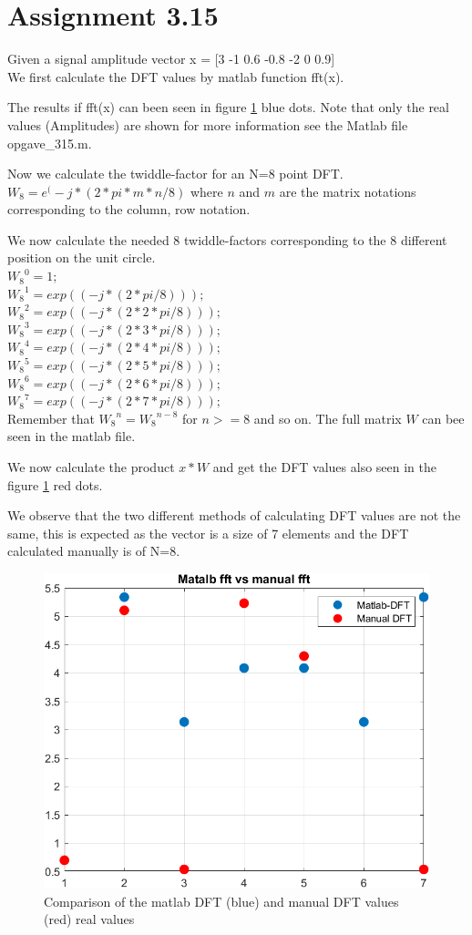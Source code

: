\section{Assignment 3.15}

Given a signal amplitude vector x = [3 -1 0.6 -0.8  -2 0 0.9]\\

We first calculate the DFT values by matlab function fft(x).

The results if fft(x) can been seen in figure \ref{fig:opg315} blue dots. Note that only the real values (Amplitudes) are shown for more information see the Matlab file opgave\_315.m.

Now we calculate the twiddle-factor for an N=8 point DFT.
$W_8 = e^(-j*(2*pi*m*n/8)$ where $n$ and $m$ are the matrix notations corresponding to the column, row notation.

We now calculate the needed 8 twiddle-factors corresponding to the 8 different position on the unit circle.\\
${W_8}^0 = 1;$\\
${W_8}^1 = exp((-j*(2*pi/8)));$\\
${W_8}^2 = exp((-j*(2*2*pi/8)));$\\
${W_8}^3 = exp((-j*(2*3*pi/8)));$\\
${W_8}^4 = exp((-j*(2*4*pi/8)));$\\
${W_8}^5 = exp((-j*(2*5*pi/8)));$\\
${W_8}^6 = exp((-j*(2*6*pi/8)));$\\
${W_8}^7 = exp((-j*(2*7*pi/8)));$\\
 
Remember that ${W_8}^n = {W_8}^{n-8}$ for $n>=8$ and so on. 
The full matrix $W$ can bee seen in the matlab file.

We now calculate the product $x*W$ and get the DFT values also seen in the figure \ref{fig:opg315} red dots. 

We observe that the two different methods of calculating DFT values are not the same, this is expected as the vector is a size of 7 elements and the DFT calculated manually is of N=8.

\begin{figure}[H]
    \centering
    \includegraphics[width=1\textwidth]{matlabStuff/opg315.PNG}
     \caption{Comparison of the matlab DFT (blue) and manual DFT values (red) real values}
    \label{fig:opg315}
\end{figure}